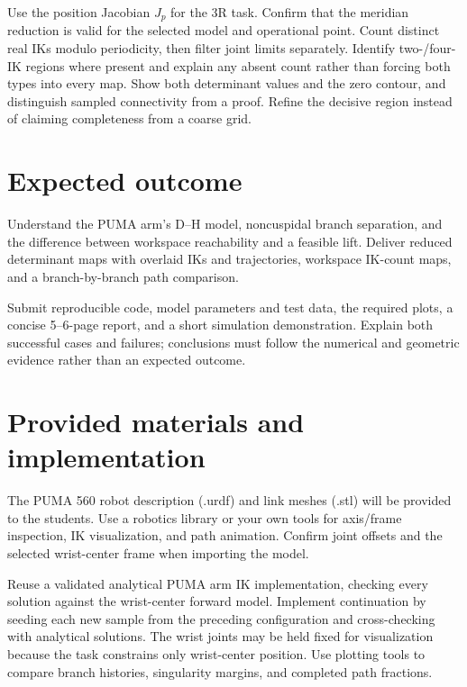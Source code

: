 \documentclass[11pt,a4paper]{article}
\begin{document}
Use the position Jacobian $J_p$ for the 3R task.
Confirm that the meridian reduction is valid for the selected model and
operational point. Count distinct real IKs modulo periodicity, then filter
joint limits separately. Identify two-/four-IK regions where present and
explain any absent count rather than forcing both types into every map. Show both determinant values and the zero contour,
and distinguish sampled connectivity from a proof. Refine the decisive
region instead of claiming completeness from a coarse grid.

\section*{Expected outcome}
Understand the PUMA arm's D--H model, noncuspidal branch separation, and
the difference between workspace reachability and a feasible lift. Deliver
reduced determinant maps with overlaid IKs and trajectories, workspace IK-count
maps, and a branch-by-branch path comparison.

Submit reproducible code, model parameters and test data, the required plots,
a concise 5--6-page report, and a short simulation demonstration. Explain
both successful cases and failures; conclusions must follow the numerical
and geometric evidence rather than an expected outcome.

\section*{Provided materials and implementation}
The PUMA 560 robot description (.urdf) and link meshes (.stl) will be provided
to the students. Use a robotics library or your own tools for axis/frame
inspection, IK visualization, and path animation. Confirm joint offsets and
the selected wrist-center frame when importing the model.

Reuse a validated analytical PUMA arm IK implementation, checking every
solution against the wrist-center forward model. Implement continuation by
seeding each new sample from the preceding configuration and cross-checking
with analytical solutions. The wrist joints may be held fixed for visualization
because the task constrains only wrist-center position. Use plotting tools
to compare branch histories, singularity margins, and completed path fractions.
\end{document}

